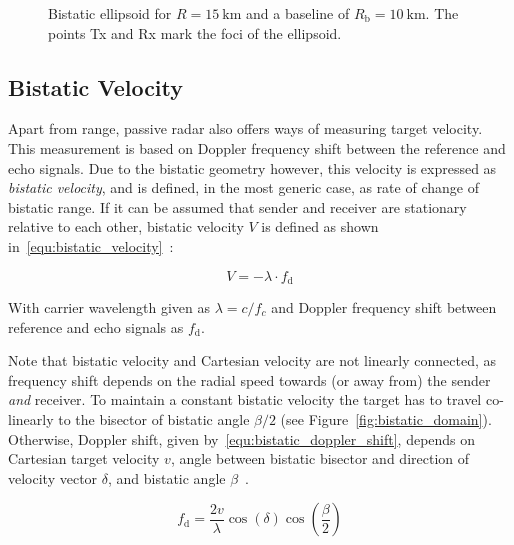 \begin{figure}[htb]
    \centering
    \begin{tikzpicture}
        
    \end{tikzpicture}
    \caption{Bistatic ellipsoid for \(R=\SI{15}{\kilo\metre}\) and a baseline of \(R_{\text{b}}=\SI{10}{\kilo\metre}\). The points Tx and Rx mark the foci of the ellipsoid.}\label{fig:bistatic_ellipsoid}
\end{figure}

\subsection{Bistatic Velocity}

Apart from range, passive radar also offers ways of measuring target velocity. This measurement is based on Doppler frequency shift between the reference and echo signals. Due to the bistatic geometry however, this velocity is expressed as \emph{bistatic velocity}, and is defined, in the most generic case, as rate of change of bistatic range. If it can be assumed that sender and receiver are stationary relative to each other, bistatic velocity \(V\) is defined as shown in~\ref{equ:bistatic_velocity}~\cite[p.~12]{Malanowski2019}:

\begin{equation}\label{equ:bistatic_velocity}
    V = -\lambda \cdot f_{\text{d}}
\end{equation}

With carrier wavelength given as \(\lambda = c / f_{c}\) and Doppler frequency shift between reference and echo signals as \(f_{\text{d}}\).

Note that bistatic velocity and Cartesian velocity are not linearly connected, as frequency shift depends on the radial speed towards (or away from) the sender \emph{and} receiver. To maintain a constant bistatic velocity the target has to travel co-linearly to the bisector of bistatic angle \(\beta/2\) (see Figure~\ref{fig:bistatic_domain}). Otherwise, Doppler shift, given by~\ref{equ:bistatic_doppler_shift}, depends on Cartesian target velocity \(v\), angle between bistatic bisector and direction of velocity vector \(\delta\), and bistatic angle \(\beta\)~\cite[p.~39]{Griffiths2017}.

\begin{equation}\label{equ:bistatic_doppler_shift}
    f_{\text{d}} = \frac{2v}{\lambda} \cos{\left(\delta\right)}\cos{\left(\frac{\beta}{2}\right)}
\end{equation}

